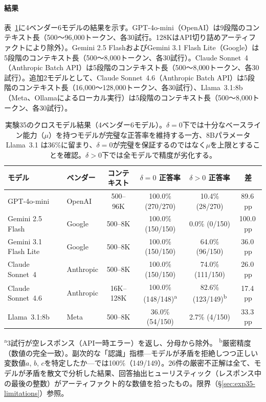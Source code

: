 \documentclass[11pt,a4paper]{article}
\begin{document}
\paragraph{結果}
表~\ref{tab:exp35}に4ベンダー6モデルの結果を示す。GPT-4o-mini（OpenAI）は9段階のコンテキスト長（500〜96{,}000トークン、各30試行。128KはAPI切り詰めアーティファクトにより除外）。Gemini 2.5 FlashおよびGemini 3.1 Flash Lite（Google）は5段階のコンテキスト長（500〜8{,}000トークン、各30試行）。Claude Sonnet~4（Anthropic Batch API）は5段階のコンテキスト長（500〜8{,}000トークン、各30試行）。追加2モデルとして、Claude Sonnet~4.6（Anthropic Batch API）は5段階のコンテキスト長（16{,}000〜128{,}000トークン、各30試行）、Llama~3.1:8b（Meta、Ollamaによるローカル実行）は5段階のコンテキスト長（500〜8{,}000トークン、各30試行）。

\begin{table}[h]
\centering
\small
\begin{tabular}{llcccc}
\toprule
\textbf{モデル} & \textbf{ベンダー} & \textbf{コンテキスト} & \textbf{$\delta = 0$ 正答率} & \textbf{$\delta > 0$ 正答率} & \textbf{差} \\
\midrule
GPT-4o-mini           & OpenAI    & 500--96K   & 100.0\% (270/270) & 10.4\% (28/270)   & 89.6\,pp \\
Gemini 2.5 Flash      & Google    & 500--8K    & 100.0\% (150/150) & 0.0\% (0/150)     & 100.0\,pp \\
Gemini 3.1 Flash Lite & Google    & 500--8K    & 100.0\% (150/150) & 64.0\% (96/150)   & 36.0\,pp \\
Claude Sonnet~4       & Anthropic & 500--8K    & 100.0\% (150/150) & 74.0\% (111/150)  & 26.0\,pp \\
Claude Sonnet~4.6     & Anthropic & 16K--128K  & 100.0\% (148/148)\textsuperscript{a} & 82.6\% (123/149)\textsuperscript{b} & 17.4\,pp \\
Llama~3.1:8b          & Meta      & 500--8K    & 36.0\% (54/150)   & 2.7\% (4/150)     & 33.3\,pp \\
\bottomrule
\end{tabular}

\vspace{2pt}
{\footnotesize \textsuperscript{a}3試行が空レスポンス（API一時エラー）を返し、分母から除外。
\textsuperscript{b}厳密精度（数値の完全一致）。副次的な「認識」指標---モデルが矛盾を拒絶しつつ正しい変数値$a$, $b$, $c$を特定したか---では100\%（149/149）。26件の厳密不正解は全て、モデルが矛盾を散文で分析した結果、回答抽出ヒューリスティック（レスポンス中の最後の整数）がアーティファクト的な数値を拾ったもの。限界（\S\ref{sec:exp35-limitations}）参照。}

\caption{実験35のクロスモデル結果（4ベンダー6モデル）。$\delta = 0$下では十分なベースライン能力（$\mu$）を持つモデルが完璧な正答率を維持する一方、8Bパラメータ Llama~3.1 は36\%に留まり、$\delta = 0$が完璧を保証するのではなく$\mu$を上限とすることを確認。$\delta > 0$下では全モデルで精度が劣化する。}
\label{tab:exp35}
\end{table}
\end{document}
